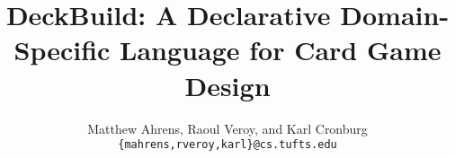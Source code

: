 \documentclass[aps,twocolumn,amsmath,amssymb]{revtex4}
\begin{document}
\title{DeckBuild: A Declarative Domain-Specific Language for Card Game Design}

\author{
  Matthew Ahrens, Raoul Veroy, and Karl Cronburg\\
  \texttt{\{mahrens,rveroy,karl\}@cs.tufts.edu}\\
}

\begin{abstract}
\end{abstract}

\maketitle





%
%

\end{document}
